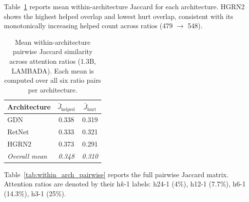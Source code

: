 Table~\ref{tab:within_arch_summary} reports mean within-architecture Jaccard for each architecture. HGRN2 shows the highest helped overlap and lowest hurt overlap, consistent with its monotonically increasing helped count across ratios (479 $\to$ 548).

\begin{table}[ht]
\centering
\caption{Mean within-architecture pairwise Jaccard similarity across attention ratios (1.3B, LAMBADA). Each mean is computed over all six ratio pairs per architecture.}
\label{tab:within_arch_summary}
\begin{tabular}{lcc}
\toprule
Architecture & $\bar{J}_{\text{helped}}$ & $\bar{J}_{\text{hurt}}$ \\
\midrule
GDN & 0.338 & 0.319 \\
RetNet & 0.333 & 0.321 \\
HGRN2 & 0.373 & 0.291 \\
\midrule
\textit{Overall mean} & \textit{0.348} & \textit{0.310} \\
\bottomrule
\end{tabular}
\end{table}

Table~\ref{tab:within_arch_pairwise} reports the full pairwise Jaccard matrix. Attention ratios are denoted by their h$k$-1 labels: h24-1 (4\%), h12-1 (7.7\%), h6-1 (14.3\%), h3-1 (25\%).

\begin{table}[ht]
\centering
\small
\caption{Within-architecture pairwise Jaccard similarity between helped and hurt sets at different attention ratios (1.3B, LAMBADA). Each cell compares the per-example effect sets of two attention configurations within the same architecture.}
\label{tab:within_arch_pairwise}
\end{table}

